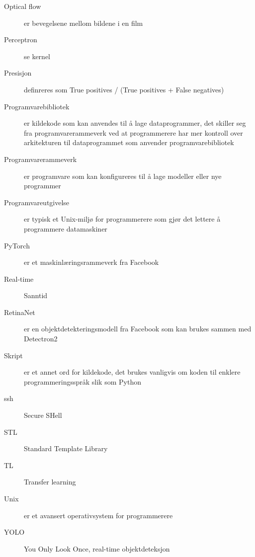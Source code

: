 \begin{description}
\item[Optical flow] er bevegelsene mellom bildene i en film
\item[Perceptron] se kernel
\item[Presisjon] definreres som True positives / (True positives + False negatives)
\item[Programvarebibliotek] er kildekode som kan anvendes til å lage dataprogrammer, det skiller seg fra programvarerammeverk ved at programmerere har mer kontroll over arkitekturen til dataprogrammet som anvender programvarebibliotek
\item[Programvarerammeverk] er programvare som kan konfigureres til å lage modeller eller nye programmer
\item[Programvareutgivelse] er typisk et Unix-miljø for programmerere som gjør det lettere å programmere datamaskiner
\item[PyTorch] er et maskinlæringsrammeverk fra Facebook
\item[Real-time] Sanntid
\item[RetinaNet] er en objektdetekteringsmodell fra Facebook som kan brukes sammen med Detectron2
\item[Skript] er et annet ord for kildekode, det brukes vanligvis om koden til enklere programmeringsspråk slik som Python
\item[ssh] Secure SHell
\item[STL] Standard Template Library
\item[TL] Transfer learning
\item[Unix] er et avansert operativsystem for programmerere
\item[YOLO] You Only Look Once, real-time objektdeteksjon


\end{description}